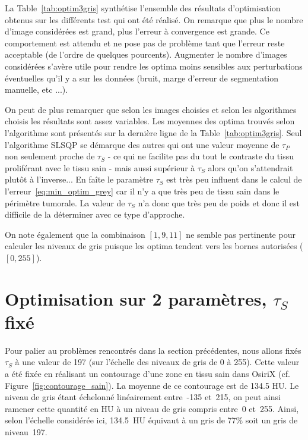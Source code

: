 \documentclass[main.tex]{subfiles}
\begin{document}
La Table~\ref{tab:optim3gris} synthétise l'ensemble des résultats d'optimisation obtenus sur les différents test qui ont été réalisé. 
On remarque que plus le nombre d'image considérées est grand, plus l'erreur à convergence est grande. Ce comportement est attendu et ne pose pas de problème tant que l'erreur reste acceptable (de l'ordre de quelques pourcents). Augmenter le nombre d'images considérées s'avère utile pour rendre les optima moins sensibles aux perturbations éventuelles qu'il y a sur les données (bruit, marge d'erreur de segmentation manuelle, etc ...).


On peut de plus remarquer que selon les images choisies et selon les algorithmes choisis les résultats sont assez variables. Les moyennes des optima trouvés selon l'algorithme sont présentés sur la dernière ligne de la Table~\ref{tab:optim3gris}. Seul l'algorithme SLSQP se démarque des autres qui ont une valeur moyenne de $\tau_P$ non seulement proche de $\tau_S$ - ce qui ne facilite pas du tout le contraste du tissu proliférant avec le tissu sain - mais aussi supérieur à $\tau_S$ alors qu'on s'attendrait plutôt à l'inverse... 
En faîte le paramètre $\tau_S$ est très peu influent dans le calcul de l'erreur~\eqref{eq:min_optim_grey} car il n'y a que très peu de tissu sain dans le périmètre tumorale. La valeur de $\tau_S$ n'a donc que très peu de poids et donc il est difficile de la déterminer avec ce type d'approche.

On note également que la combinaison $[1,9,11]$ ne semble pas pertinente pour calculer les niveaux de gris puisque les optima tendent vers les bornes autorisées ($[0,255]$).

\section{Optimisation sur 2 paramètres, $\tau_S$ fixé}
Pour palier au problèmes rencontrés dans la section précédentes, nous allons fixés $\tau_S$ à une valeur de 197 (sur l'échelle des niveaux de gris de 0 à 255). Cette valeur a été fixée en réalisant un contourage d'une zone en tissu sain dans OsiriX (cf. Figure~\ref{fig:contourage_sain}). La moyenne de ce contourage est de 134.5 HU. Le niveau de gris étant échelonné linéairement entre~-135 et~215, on peut ainsi ramener cette quantité en HU à un niveau de gris compris entre~0 et~255. Ainsi, selon l'échelle considérée ici, 134.5~HU équivaut à un gris de 77\% soit un gris de niveau~197.
\end{document}
